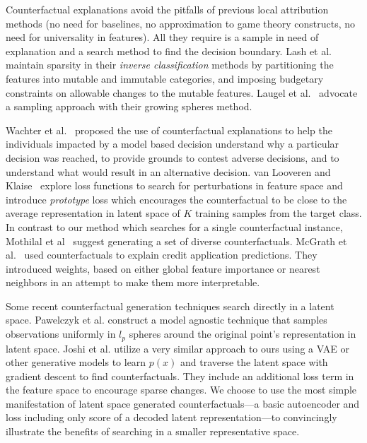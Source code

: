 \documentclass[letterpaper]{article} %
\begin{document}
Counterfactual explanations avoid the pitfalls of previous local attribution methods (no need for baselines, no approximation to game theory constructs, no need for universality in features).  All they require is a sample in need of explanation and a search method to find the decision boundary.  Lash  et al.~\cite{lash2016} maintain  sparsity  in  their  \textit{inverse  classification} methods  by  partitioning  the  features  into mutable and immutable categories, and imposing budgetary constraints on allowable changes to the mutable features.  Laugel et al.~\cite{laugel2018} advocate a sampling approach with their growing spheres method.

Wachter et al.~\cite{wachter2017counterfactual} proposed the use of counterfactual explanations to help the individuals impacted by a model based decision understand why a particular decision was reached, to provide grounds to contest adverse decisions,  and to  understand  what would result in an alternative decision.  van Looveren and Klaise~\cite{looveren2019interpretable} explore loss functions to search for perturbations in feature space and introduce \textit{prototype} loss which encourages the counterfactual to be close to the average representation in latent space of $K$ training samples from the target class.  In contrast to our method which searches for a single counterfactual instance, Mothilal et al~\cite{mothilal2020} suggest generating a set of diverse counterfactuals.  McGrath et al.~\cite{mcgrath2018} used counterfactuals to explain credit application predictions.  They introduced weights, based on either global feature importance or nearest neighbors in an attempt to make them more interpretable.

Some recent counterfactual generation techniques search directly in a latent space. Pawelczyk et al. \cite{Pawelczyk_2020} construct a model agnostic technique that samples observations uniformly in $l_p$ spheres around the original point's representation in latent space. Joshi et al. \cite{joshi2019realistic} utilize a very similar approach to ours using a VAE or other generative models to learn $p(x)$ and traverse the latent space with gradient descent to find counterfactuals. They include an additional loss term in the feature space to encourage sparse changes. We choose to use the most simple manifestation of latent space generated counterfactuals---a basic autoencoder and loss including only score of a decoded latent representation---to convincingly illustrate the benefits of searching in a smaller representative space. 
\end{document}
